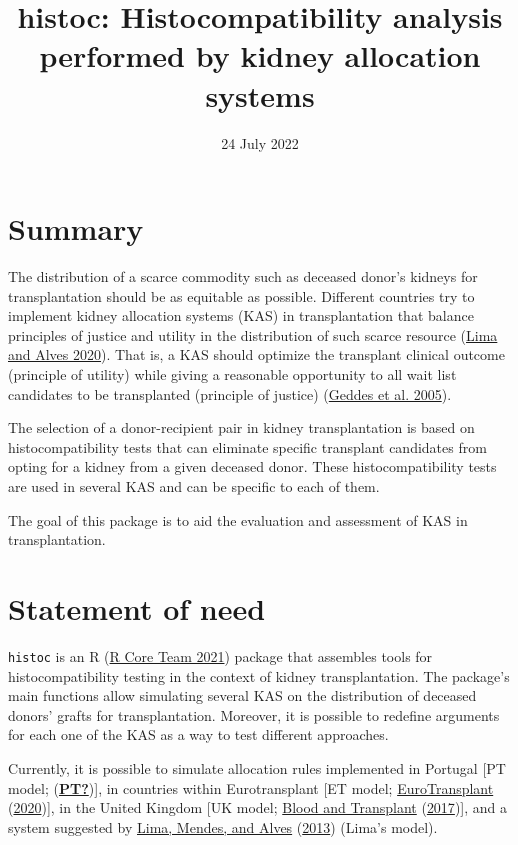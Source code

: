\documentclass[
]{article}
\title{histoc: Histocompatibility analysis performed by kidney
allocation systems}
\author{}
\date{\vspace{-2.5em}24 July 2022}
\begin{document}
\maketitle

\hypertarget{summary}{%
\section{Summary}\label{summary}}

The distribution of a scarce commodity such as deceased donor's kidneys
for transplantation should be as equitable as possible. Different
countries try to implement kidney allocation systems (KAS) in
transplantation that balance principles of justice and utility in the
distribution of such scarce resource
(\protect\hyperlink{ref-Lima:2020}{Lima and Alves 2020}). That is, a KAS
should optimize the transplant clinical outcome (principle of utility)
while giving a reasonable opportunity to all wait list candidates to be
transplanted (principle of justice)
(\protect\hyperlink{ref-Geddes:2005}{Geddes et al. 2005}).

The selection of a donor-recipient pair in kidney transplantation is
based on histocompatibility tests that can eliminate specific transplant
candidates from opting for a kidney from a given deceased donor. These
histocompatibility tests are used in several KAS and can be specific to
each of them.

The goal of this package is to aid the evaluation and assessment of KAS
in transplantation.

\hypertarget{statement-of-need}{%
\section{Statement of need}\label{statement-of-need}}

\texttt{histoc} is an R (\protect\hyperlink{ref-R}{R Core Team 2021})
package that assembles tools for histocompatibility testing in the
context of kidney transplantation. The package's main functions allow
simulating several KAS on the distribution of deceased donors' grafts
for transplantation. Moreover, it is possible to redefine arguments for
each one of the KAS as a way to test different approaches.

Currently, it is possible to simulate allocation rules implemented in
Portugal {[}PT model; (\protect\hyperlink{ref-PT}{\textbf{PT?}}){]}, in
countries within Eurotransplant {[}ET model;
\protect\hyperlink{ref-ET}{EuroTransplant}
(\protect\hyperlink{ref-ET}{2020}){]}, in the United Kingdom {[}UK
model; \protect\hyperlink{ref-UK}{Blood and Transplant}
(\protect\hyperlink{ref-UK}{2017}){]}, and a system suggested by
\protect\hyperlink{ref-Lima:2013}{Lima, Mendes, and Alves}
(\protect\hyperlink{ref-Lima:2013}{2013}) (Lima's model).
\end{document}
